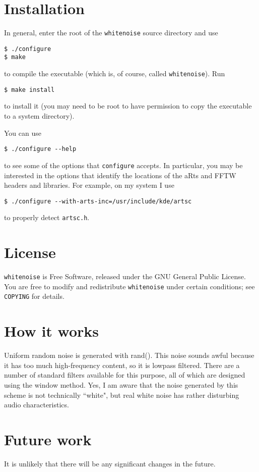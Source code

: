 \documentclass[12pt,oneside,notitlepage]{article}
\begin{document}
\section{Installation}
In general, enter the root of the {\tt whitenoise} source directory and use
\begin{verbatim}
$ ./configure
$ make
\end{verbatim}
to compile the executable (which is, of course, called {\tt whitenoise}).  Run
\begin{verbatim}
$ make install
\end{verbatim}
to install it (you may need to be root to have permission to copy the executable
to a system directory).

You can use
\begin{verbatim}
$ ./configure --help
\end{verbatim}
to see some of the options that {\tt configure} accepts.  In particular, you may be interested in
the options that identify the locations of the aRts and FFTW headers and libraries.  For example, on my
system I use 
\begin{verbatim}
$ ./configure --with-arts-inc=/usr/include/kde/artsc
\end{verbatim}
to properly detect {\tt artsc.h}.


\section{License}
{\tt whitenoise} is Free Software, released under the GNU General Public License.
You are free to modify and redistribute {\tt whitenoise} under certain conditions; 
see {\tt COPYING} for details.



\section{How it works}
Uniform random noise is generated with rand().  This noise sounds awful because
it has too much high-frequency content, so it is lowpass filtered.  There are
a number of standard filters available for this purpose, all of which are 
designed using the window method.  Yes, I am aware that the noise generated 
by this scheme is not technically ``white", but real white noise has rather 
disturbing audio characteristics.



\section{Future work}
It is unlikely that there will be any significant changes in the future.
\end{document}
